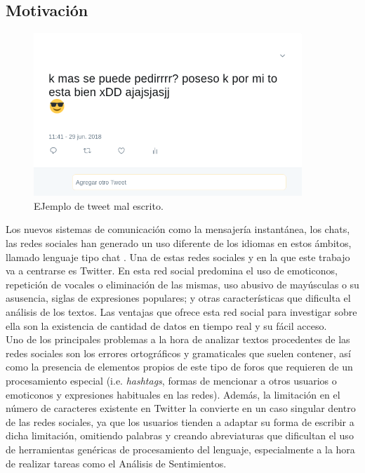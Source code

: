 \documentclass[spanish,12pt, a4paper,twoside]{paper}
\begin{document}
\subsection{Motivación}\label{sec:motivacion}
\begin{figure}[h]
\begin{center}
 \includegraphics[width=0.9\textwidth]{recursos/TweetBad.png}
\caption{EJemplo de tweet mal escrito.}
\label{fig:tweetbad}
\end{center}
\end{figure}

Los nuevos sistemas de comunicación como la mensajería instantánea, los chats, las redes sociales han generado un uso diferente de los idiomas en estos ámbitos, llamado lenguaje tipo chat \cite{forsyth:2007}. Una de estas redes sociales y en la que este trabajo va a centrarse es Twitter. En esta red social predomina el uso de emoticonos, repetición de vocales o eliminación de las mismas, uso abusivo de mayúsculas o su asusencia, siglas de expresiones populares; y otras características que dificulta el análisis de los textos. Las ventajas que ofrece esta red social para investigar sobre ella son la existencia  de cantidad de datos en tiempo real y su fácil acceso.\\

Uno de los principales problemas a la hora de analizar textos procedentes de las redes sociales son los errores ortográficos y gramaticales que suelen contener, así como la presencia de elementos propios de este tipo de foros que requieren de un procesamiento especial (i.e. \textit{hashtags}, formas de mencionar a otros usuarios o emoticonos y expresiones habituales en las redes). Además, la limitación en el número de caracteres existente en Twitter la convierte en un caso singular dentro de las redes sociales, ya que los usuarios tienden a adaptar su forma de escribir a dicha limitación, omitiendo palabras y creando abreviaturas que dificultan el uso de herramientas genéricas de procesamiento del lenguaje, especialmente a la hora de realizar tareas como el Análisis de Sentimientos.\\
\end{document}
